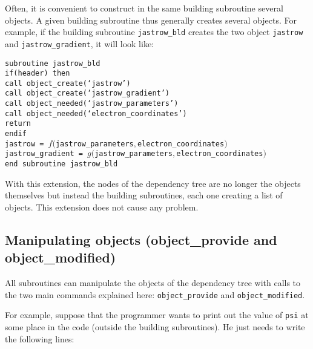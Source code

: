 \documentclass[letter,11pt]{article}
\begin{document}
\vspace{1em}
Often, it is convenient to construct in the same building subroutine several objects. A given building subroutine thus generally creates several objects. For example, if the building subroutine {\tt jastrow_bld} creates the two object {\tt jastrow} and {\tt jastrow_gradient}, it will look like:

\vspace{0.5cm}
\noindent
{\tt subroutine jastrow_bld\\
if(header) then\\
\phantom{xx} call object_create(`jastrow')\\
\phantom{xx} call object_create(`jastrow_gradient')\\
\phantom{xx} call object_needed(`jastrow_parameters')\\
\phantom{xx} call object_needed(`electron_coordinates')\\
\phantom{xx} return\\
endif\\
jastrow  = $f(${\tt jastrow_parameters}$,${\tt electron_coordinates}$)$\\
jastrow_gradient  = $g(${\tt jastrow_parameters}$,${\tt electron_coordinates}$)$\\
end subroutine jastrow_bld}

\vspace{0.5cm}
With this extension, the nodes of the dependency tree are no longer the objects themselves but instead the building subroutines, each one creating a list of objects. This extension does not cause any problem.

\subsection{Manipulating objects (object_provide and object_modified)}

All subroutines can manipulate the objects of the dependency tree with calls to the two main commands explained here: {\tt object_provide} and {\tt object_modified}.

\vspace{1em}

For example, suppose that the programmer wants to print out the value of {\tt psi} at some place in the code (outside the building subroutines). He just needs to write the following lines:
\end{document}
